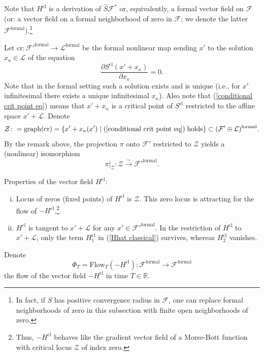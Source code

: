 \documentclass{amsart}
\theoremstyle{plain} %
\theoremstyle{definition}
\theoremstyle{remark}
\newcommand{\mc}{\mathcal}
\newcommand{\mr}{\mathrm}
\newcommand{\ra}{\rightarrow}
\newcommand{\wh}{\widehat}
\newcommand{\bl}{\color{blue}}
\newcommand{\F}{\mathcal{F}}
\newcommand{\LL}{\mathcal{L}}
\newcommand{\RR}{\mathbb{R}}
\newcommand{\xra}{\xrightarrow}
\newcommand{\dd}{\partial}
\newcommand{\cl}{\mathrm{cl}}
\newcommand{\formal}{\mathrm{formal}}
\newcommand{\Cr}{\mathrm{cr}}
\begin{document}
Note that $H^\cl$ is a derivation of $\wh{S}\F^*$ or, equivalently, a formal vector field on $\F$ (or: a vector field on a formal neighborhood of zero in $\F$; we denote the latter $\F^\formal$).\footnote{
In fact, if $S$ has positive convergence radius in $\F$, one can replace formal neighborhoods of zero in this subsection with finite open neighborhoods of zero.
}

Let $\Cr\colon \F'^\formal\ra \LL^\formal$ be the formal nonlinear map sending $x'$ to the solution $x_\kappa\in \LL$ of the equation
\begin{equation}\label{conditional crit point eq}
    \frac{\dd S^\cl(x'+x_\kappa)}{\dd x_\kappa}=0.
\end{equation}
Note that in the formal setting such a solution exists and is unique (i.e., for $x'$ infinitesimal there exists a unique infinitesimal $x_\kappa$). Also note that (\ref{conditional crit point eq}) means that $x'+x_\kappa$ is a critical point of $S^\cl$ restricted to the affine space $x'+\LL$. Denote
\begin{equation}
    \mc{Z}\colon=\mr{graph}(\Cr)=\{x'+x_\kappa(x')\;|\; (\ref{conditional crit point eq})\;\mr{holds}\}\subset (\F'\oplus\LL)^\formal.
\end{equation}
By the remark above, the projection $\pi$ onto $\F'$ restricted to $\mc{Z}$ yields a (nonlinear) isomorphism 
\begin{equation}\label{pi|_Z}
    \pi|_{\mc{Z}}\colon \mc{Z} \xra{\sim} \F'^\formal.
\end{equation}

Properties of the vector field $H^\cl$:
\begin{enumerate}[(i)]
    \item Locus of zeros (fixed points) of $H^\cl$ is $\mc{Z}$. This zero locus is attracting for the flow of $-H^\cl$.\footnote{Thus, $-H^\cl$ behaves like the gradient vector field of a  Morse-Bott function with critical locus $\mc{Z}$ of index zero.}
    \item $H^\cl$ is tangent to $x'+\LL$ for any $x'\in \F'^\formal$. In the restriction of $H^\cl$ to $x'+\LL$, only the term $H^\cl_1$ in (\ref{Hhat classical}) survives, whereas $H^\cl_2$ vanishes.
\end{enumerate}

Denote 
\begin{equation}
    \Phi_T=\mr{Flow}_T(-H^\cl)\colon \F^\formal \ra \F^\formal
\end{equation}
the flow of the vector field $-H^\cl$ in time $T\in \RR$.
\end{document}
